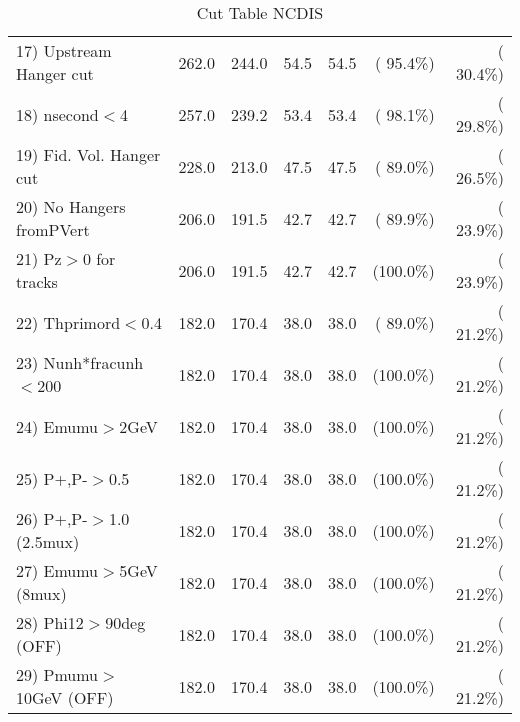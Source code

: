 \begin{table}[h!]
\begin{tabular}{||l||r|r|r|r|r|r||}
 17) Upstream Hanger cut  &        262.0 &        244.0 &         54.5 &         54.5 & ( 95.4\%) & ( 30.4\%) \\
 18) nsecond$<$4          &        257.0 &        239.2 &         53.4 &         53.4 & ( 98.1\%) & ( 29.8\%) \\
 19) Fid. Vol. Hanger cut &        228.0 &        213.0 &         47.5 &         47.5 & ( 89.0\%) & ( 26.5\%) \\
 20) No Hangers fromPVert &        206.0 &        191.5 &         42.7 &         42.7 & ( 89.9\%) & ( 23.9\%) \\
 21) Pz$>$0 for tracks    &        206.0 &        191.5 &         42.7 &         42.7 & (100.0\%) & ( 23.9\%) \\
 22) Thprimord$<$0.4      &        182.0 &        170.4 &         38.0 &         38.0 & ( 89.0\%) & ( 21.2\%) \\
 23) Nunh*fracunh$<$200   &        182.0 &        170.4 &         38.0 &         38.0 & (100.0\%) & ( 21.2\%) \\
 24) Emumu$>$2GeV         &        182.0 &        170.4 &         38.0 &         38.0 & (100.0\%) & ( 21.2\%) \\
 25) P+,P-$>$0.5          &        182.0 &        170.4 &         38.0 &         38.0 & (100.0\%) & ( 21.2\%) \\
 26) P+,P-$>$1.0 (2.5mux) &        182.0 &        170.4 &         38.0 &         38.0 & (100.0\%) & ( 21.2\%) \\
 27) Emumu$>$5GeV  (8mux) &        182.0 &        170.4 &         38.0 &         38.0 & (100.0\%) & ( 21.2\%) \\
 28) Phi12$>$90deg  (OFF) &        182.0 &        170.4 &         38.0 &         38.0 & (100.0\%) & ( 21.2\%) \\
 29) Pmumu$>$10GeV  (OFF) &        182.0 &        170.4 &         38.0 &         38.0 & (100.0\%) & ( 21.2\%) \\
 \hline
 \hline
 \end{tabular}
 \caption{Cut Table  NCDIS    }
 \label{tab-cutcohjpsi-mumu_ncdis}
 \end{table}
